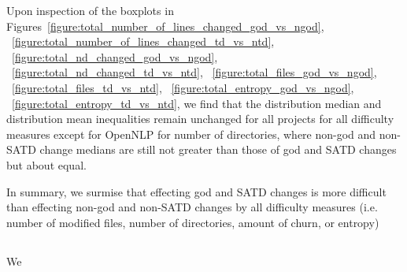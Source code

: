 Upon inspection of the boxplots in Figures~\ref{figure:total_number_of_lines_changed_god_vs_ngod},
~\ref{figure:total_number_of_lines_changed_td_vs_ntd},
~\ref{figure:total_nd_changed_god_vs_ngod},
~\ref{figure:total_nd_changed_td_vs_ntd},
~\ref{figure:total_files_god_vs_ngod},
~\ref{figure:total_files_td_vs_ntd},
~\ref{figure:total_entropy_god_vs_ngod},
~\ref{figure:total_entropy_td_vs_ntd}, we find that the distribution median and distribution mean inequalities remain unchanged for all projects for all difficulty measures except for OpenNLP for number of directories, where non-god and non-SATD change medians are still not greater than those of god and SATD changes but about equal.

In summary, we surmise that effecting god and SATD changes is more difficult than effecting non-god and non-SATD changes by all difficulty measures (i.e. number of modified files, number of directories, amount of churn, or entropy)




\subsection*{\chapterIVrqIV}




We 




